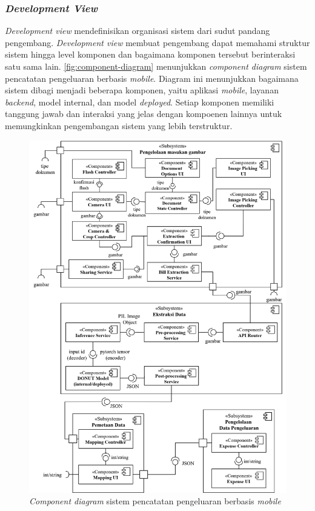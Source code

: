 \subsubsection{\emph{Development View}}
\label{subsubsec:development-view}
\emph{Development view} mendefinisikan organisasi sistem dari sudut pandang pengembang. \emph{Development view} membuat pengembang dapat memahami struktur sistem hingga level komponen dan bagaimana komponen tersebut berinteraksi satu sama lain. \autoref{fig:component-diagram} menunjukkan \emph{component diagram} sistem pencatatan pengeluaran berbasis \emph{mobile}. Diagram ini menunjukkan bagaimana sistem dibagi menjadi beberapa komponen, yaitu aplikasi \emph{mobile}, layanan \emph{backend}, model internal, dan model \emph{deployed}. Setiap komponen memiliki tanggung jawab dan interaksi yang jelas dengan kompoenen lainnya untuk memungkinkan pengembangan sistem yang lebih terstruktur.

\begin{figure}[htbp]
    \centering
    \includegraphics[width=1\textwidth]{images/component-diagram.png}
    \caption{\emph{Component diagram} sistem pencatatan pengeluaran berbasis \emph{mobile}}
    \label{fig:component-diagram}
\end{figure}